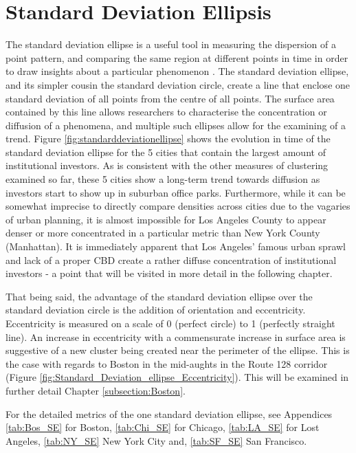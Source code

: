 \section{Standard Deviation Ellipsis}

The standard deviation ellipse is a useful tool in measuring the dispersion of a point pattern, and comparing the same region at different points in time in order to draw insights about a particular phenomenon \citep{Yuill1971}. The standard deviation ellipse, and its simpler cousin the standard deviation circle, create a line that enclose one standard deviation of all points from the centre of all points.  The surface area contained by this line allows researchers to characterise the concentration or diffusion of a phenomena, and multiple such ellipses allow for the examining of a trend.  Figure \ref{fig:standarddeviationellipse} shows the evolution in time of the standard deviation ellipse for the 5 cities that contain the largest amount of institutional investors. As is consistent with the other measures of clustering examined so far, these 5 cities show a long-term trend towards diffusion as investors start to show up in suburban office parks. Furthermore, while it can be somewhat imprecise to directly compare densities across cities due to the vagaries of urban planning, it is almost impossible for Los Angeles County to appear denser or more concentrated in a particular metric than New York County (Manhattan). It is immediately apparent that Los Angeles' famous urban sprawl and lack of a proper CBD create a rather diffuse concentration of institutional investors - a point that will be visited in more detail in the following chapter.  

That being said, the advantage of the standard deviation ellipse over the standard deviation circle is the addition of orientation and eccentricity. Eccentricity is measured on a scale of 0 (perfect circle) to 1 (perfectly straight line).  An increase in eccentricity with a commensurate increase in surface area is suggestive of a new cluster being created near the perimeter of the ellipse. This is the case with regards to Boston in the mid-aughts in the Route 128 corridor (Figure \ref{fig:Standard_Deviation_ellipse_Eccentricity}). This will be examined in further detail Chapter \ref{subsection:Boston}.     

For the detailed metrics of the one standard deviation ellipse, see Appendices \ref{tab:Bos_SE} for Boston, \ref{tab:Chi_SE} for Chicago, \ref{tab:LA_SE} for Lost Angeles, \ref{tab:NY_SE} New York City and, \ref{tab:SF_SE} San Francisco.  

